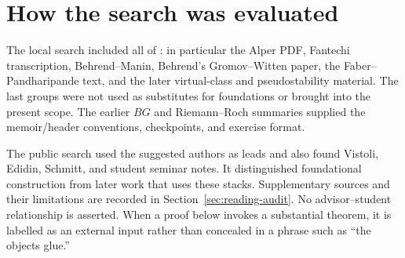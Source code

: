 \section{How the search was evaluated}

The local search included all of :
in particular the Alper PDF, Fantechi transcription, Behrend--Manin,
Behrend's Gromov--Witten paper, the Faber--Pandharipande text, and the
later virtual-class and pseudostability material. The last groups
were not used as substitutes for foundations or brought into the
present scope. The earlier $BG$ and Riemann--Roch summaries supplied
the memoir/header conventions, checkpoints, and exercise format.

The public search used the suggested authors as leads and also found
Vistoli, Edidin, Schmitt, and student seminar notes. It distinguished
foundational construction from later work that uses these stacks.
Supplementary sources and their limitations are recorded in
Section~\ref{sec:reading-audit}. No advisor--student relationship is
asserted. When a proof below invokes a substantial theorem, it is
labelled as an external input rather than concealed in a phrase such
as ``the objects glue.''
